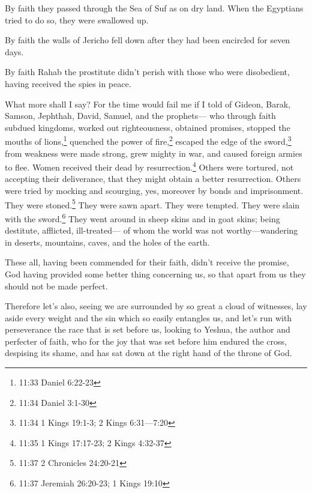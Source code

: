 \myverse{}By faith they passed through the Sea of Suf as on dry land.
When the Egyptians tried to do so, they were swallowed up.

\myverse{}By faith the walls of Jericho fell down after they had been
encircled for seven days.



\myverse{}By faith Rahab the prostitute didn’t perish with those who were
disobedient, having received the spies in peace.

\myverse{}What more shall I say? For the time would fail me if I told
of Gideon, Barak, Samson, Jephthah, David, Samuel, and the prophets—
\myverse{}who through faith subdued kingdoms, worked out righteousness, obtained promises,
stopped the mouths of lions,\footnote{11:33 Daniel 6:22-23}
\myverse{}quenched the power of fire,\footnote{11:34 Daniel 3:1-30} escaped the edge of the sword,\footnote{11:34 1 Kings 19:1-3;
	2 Kings 6:31—7:20} from weakness were made
strong, grew mighty in war, and caused foreign armies to flee.
\myverse{}Women received their dead by resurrection.\footnote{11:35 1 Kings 17:17-23;
	2 Kings 4:32-37} Others were tortured, not accepting their deliverance,
that they might obtain a better resurrection.
\myverse{}Others were tried by mocking and scourging, yes, moreover by bonds and imprisonment.
\myverse{}They were stoned.\footnote{11:37 2 Chronicles 24:20-21} They were sawn apart. They were tempted.
They were slain with the sword.\footnote{11:37 Jeremiah 26:20-23;
	1 Kings 19:10} They went around in sheep skins and in goat skins; being
destitute, afflicted, ill-treated—
\myverse{}of whom the world was not worthy—wandering in deserts, mountains, caves,
and the holes of the earth.

\myverse{}These all, having been commended for their faith, didn’t receive
the promise,
\myverse{}God having provided some better thing concerning us, so that apart from us
they should not be made perfect.


\mychapter{} \myverse*{}Therefore let’s also, seeing we are surrounded by so great a cloud
of witnesses, lay aside every weight and the sin which so easily entangles us, and let’s run with perseverance
the race that is set before us,
\myverse{}looking to Yeshua, the author and perfecter of faith, who for the joy that
was set before him endured the cross, despising its shame, and has sat down at the right hand of the throne
of God.

